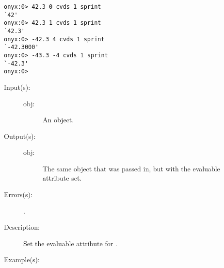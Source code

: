 \begin{description}
\begin{description}
\begin{verbatim}
onyx:0> 42.3 0 cvds 1 sprint
`42'
onyx:0> 42.3 1 cvds 1 sprint
`42.3'
onyx:0> -42.3 4 cvds 1 sprint
`-42.3000'
onyx:0> -43.3 -4 cvds 1 sprint
`-42.3'
onyx:0>
		\end{verbatim}
	\end{description}
\label{systemdict:cve}
\item[{\onyxop{obj}{cve}{obj}}: ]
	\begin{description}\item[]
	\item[Input(s): ]
		\begin{description}\item[]
		\item[obj: ]
			An object.
		\end{description}
	\item[Output(s): ]
		\begin{description}\item[]
		\item[obj: ]
			The same object that was passed in, but with the
			evaluable attribute set.
		\end{description}
	\item[Errors(s): ]
		\begin{description}\item[]
		\item[.]
		\end{description}
	\item[Description: ]
		Set the evaluable attribute for .
	\item[Example(s): ]\begin{verbatim}


\end{verbatim}
\end{description}
\end{description}
